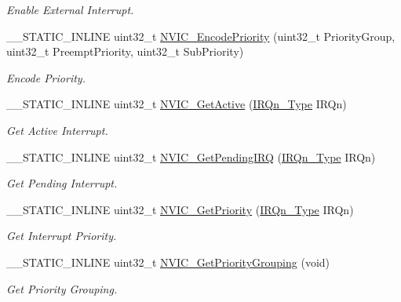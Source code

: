 \begin{DoxyCompactItemize}
\begin{DoxyCompactList}\small\item\em Enable External Interrupt. \end{DoxyCompactList}\item 
\+\_\+\+\_\+\+S\+T\+A\+T\+I\+C\+\_\+\+I\+N\+L\+I\+NE uint32\+\_\+t \hyperlink{group__CMSIS__Core__NVICFunctions_gadb94ac5d892b376e4f3555ae0418ebac}{N\+V\+I\+C\+\_\+\+Encode\+Priority} (uint32\+\_\+t Priority\+Group, uint32\+\_\+t Preempt\+Priority, uint32\+\_\+t Sub\+Priority)
\begin{DoxyCompactList}\small\item\em Encode Priority. \end{DoxyCompactList}\item 
\+\_\+\+\_\+\+S\+T\+A\+T\+I\+C\+\_\+\+I\+N\+L\+I\+NE uint32\+\_\+t \hyperlink{group__CMSIS__Core__NVICFunctions_ga47a0f52794068d076c9147aa3cb8d8a6}{N\+V\+I\+C\+\_\+\+Get\+Active} (\hyperlink{group__CMSIS__175X__6X__IRQ_gaaaeafe7bd8401a46d55e8431b6326116}{I\+R\+Qn\+\_\+\+Type} I\+R\+Qn)
\begin{DoxyCompactList}\small\item\em Get Active Interrupt. \end{DoxyCompactList}\item 
\+\_\+\+\_\+\+S\+T\+A\+T\+I\+C\+\_\+\+I\+N\+L\+I\+NE uint32\+\_\+t \hyperlink{group__CMSIS__Core__NVICFunctions_gafec8042db64c0f8ed432b6c8386a05d8}{N\+V\+I\+C\+\_\+\+Get\+Pending\+I\+RQ} (\hyperlink{group__CMSIS__175X__6X__IRQ_gaaaeafe7bd8401a46d55e8431b6326116}{I\+R\+Qn\+\_\+\+Type} I\+R\+Qn)
\begin{DoxyCompactList}\small\item\em Get Pending Interrupt. \end{DoxyCompactList}\item 
\+\_\+\+\_\+\+S\+T\+A\+T\+I\+C\+\_\+\+I\+N\+L\+I\+NE uint32\+\_\+t \hyperlink{group__CMSIS__Core__NVICFunctions_ga1cbaf8e6abd4aa4885828e7f24fcfeb4}{N\+V\+I\+C\+\_\+\+Get\+Priority} (\hyperlink{group__CMSIS__175X__6X__IRQ_gaaaeafe7bd8401a46d55e8431b6326116}{I\+R\+Qn\+\_\+\+Type} I\+R\+Qn)
\begin{DoxyCompactList}\small\item\em Get Interrupt Priority. \end{DoxyCompactList}\item 
\+\_\+\+\_\+\+S\+T\+A\+T\+I\+C\+\_\+\+I\+N\+L\+I\+NE uint32\+\_\+t \hyperlink{group__CMSIS__Core__NVICFunctions_ga394f7ce2ca826c0da26284d17ac6524d}{N\+V\+I\+C\+\_\+\+Get\+Priority\+Grouping} (void)
\begin{DoxyCompactList}\small\item\em Get Priority Grouping. \end{DoxyCompactList}\item 

\end{DoxyCompactItemize}
